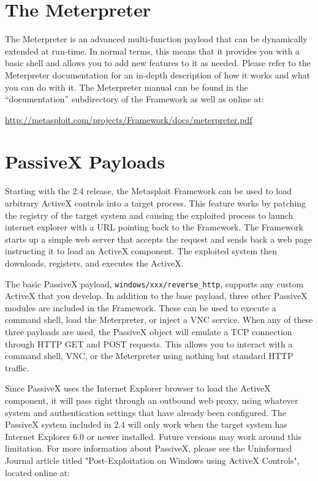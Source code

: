 \documentclass{report}
\begin{document}
\section{The Meterpreter}
\par
The Meterpreter is an advanced multi-function payload that can be dynamically
extended at run-time. In normal terms, this means that it provides you with a
basic shell and allows you to add new features to it as needed. Please refer
to the Meterpreter documentation for an in-depth description of how it works
and what you can do with it. The Meterpreter manual can be found in the
``documentation'' subdirectory of the Framework as well as online at:

\url{http://metasploit.com/projects/Framework/docs/meterpreter.pdf}

\section{PassiveX Payloads}

\par Starting with the 2.4 release, the Metasploit Framework can be used to
load arbitrary ActiveX controls into a target process. This feature works by
patching the registry of the target system and causing the exploited process
to launch internet explorer with a URL pointing back to the Framework. The
Framework starts up a simple web server that accepts the request and sends
back a web page instructing it to load an ActiveX component. The exploited
system then downloads, registers, and executes the ActiveX. 

\par
The basic PassiveX payload, \texttt{windows/xxx/reverse\_http}, supports any
custom ActiveX that you develop. In addition to the base payload, three other
PassiveX modules are included in the Framework. These can be used to execute a
command shell, load the Meterpreter, or inject a VNC service. When any of
these three payloads are used, the PassiveX object will emulate a TCP
connection through HTTP GET and POST requests. This allows you to interact
with a command shell, VNC, or the Meterpreter using nothing but standard HTTP
traffic.

\par
Since PassiveX uses the Internet Explorer browser to load the ActiveX
component, it will pass right through an outbound web proxy, using whatever
system and authentication settings that have already been configured. The
PassiveX system included in 2.4 will only work when the target system has
Internet Explorer 6.0 or newer installed. Future versions may work around this
limitation. For more information about PassiveX, please see the Uninformed
Journal article titled "Post-Exploitation on Windows using ActiveX Controls",
located online at:
\end{document}
